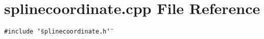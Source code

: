 \section{splinecoordinate.cpp File Reference}
\label{splinecoordinate_8cpp}
{\tt \#include \char`\"{}splinecoordinate.h\char`\"{}}\par
